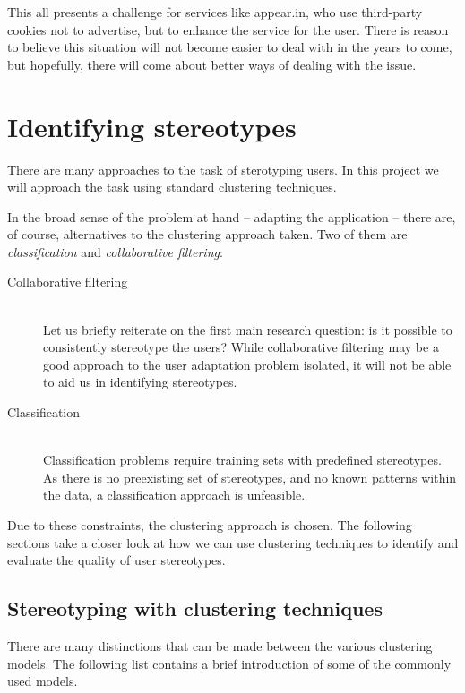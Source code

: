       This all presents a challenge for services like appear.in, who use third-party cookies not to advertise, but to enhance the service for the user. There is reason to believe this situation will not become easier to deal with in the years to come, but hopefully, there will come about better ways of dealing with the issue.

\section{Identifying stereotypes}
\label{survey:identifying_sterotypes}

  There are many approaches to the task of sterotyping users. In this project we will approach the task using standard clustering techniques.

  In the broad sense of the problem at hand -- adapting the application -- there are, of course, alternatives to the clustering approach taken. Two of them are \emph{classification} and \emph{collaborative filtering}:

  \begin{description}
    \item[Collaborative filtering] \hfill \\
      Let us briefly reiterate on the first main research question: is it possible to consistently stereotype the users? While collaborative filtering may be a good approach to the user adaptation problem isolated, it will not be able to aid us in identifying stereotypes.
    \item[Classification] \hfill \\
      Classification problems require training sets with predefined stereotypes. As there is no preexisting set of stereotypes, and no known patterns within the data, a classification approach is unfeasible.
  \end{description}

  Due to these constraints, the clustering approach is chosen. The following sections take a closer look at how we can use clustering techniques to identify and evaluate the quality of user stereotypes.

  \subsection{Stereotyping with clustering techniques}
  \label{survey:clustering_intro}

    There are many distinctions that can be made between the various clustering models. The following list contains a brief introduction of some of the commonly used models.

